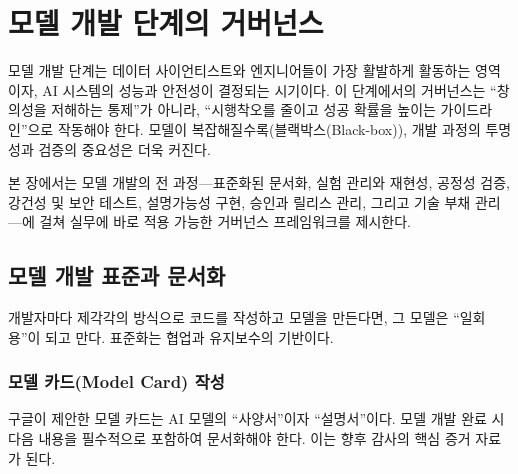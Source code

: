 
\chapter{모델 개발 단계의 거버넌스}
\label{ch:model_development}

모델 개발 단계는 데이터 사이언티스트와 엔지니어들이 가장 활발하게 활동하는 영역이자, AI 시스템의 성능과 안전성이 결정되는 시기이다. 이 단계에서의 거버넌스는 ``창의성을 저해하는 통제''가 아니라, ``시행착오를 줄이고 성공 확률을 높이는 가이드라인''으로 작동해야 한다. 모델이 복잡해질수록(블랙박스(Black-box)), 개발 과정의 투명성과 검증의 중요성은 더욱 커진다.

본 장에서는 모델 개발의 전 과정---표준화된 문서화, 실험 관리와 재현성\cite{studer2021towards}, 공정성 검증, 강건성\cite{madry2018towards} 및 보안 테스트, 설명가능성 구현, 승인과 릴리스 관리, 그리고 기술 부채 관리---에 걸쳐 실무에 바로 적용 가능한 거버넌스 프레임워크를 제시한다.

\section{모델 개발 표준과 문서화}
\label{sec:10.1}

개발자마다 제각각의 방식으로 코드를 작성하고 모델을 만든다면, 그 모델은 ``일회용''이 되고 만다. 표준화는 협업과 유지보수의 기반\cite{paleyes2022challenges}이다.

\subsection{모델 카드(Model Card) 작성}
\label{sec:10.1.1}

구글이 제안한 모델 카드\cite{mitchell2019model}는 AI 모델의 ``사양서''이자 ``설명서''\cite{arnold2019factsheets}이다. 모델 개발 완료 시 다음 내용을 필수적으로 포함하여 문서화해야 한다. 이는 향후 감사의 핵심 증거 자료가 된다.

